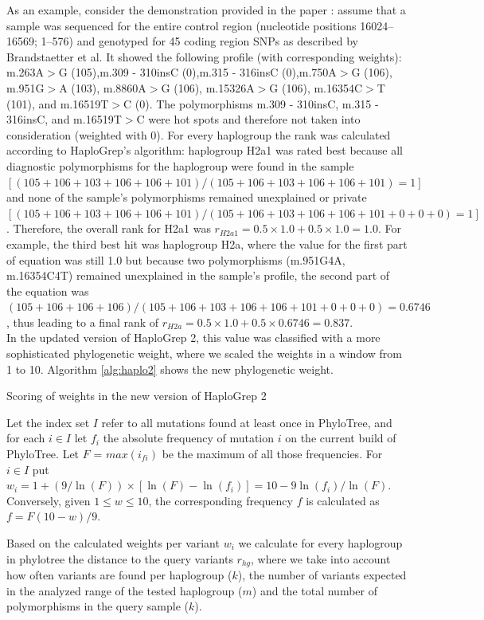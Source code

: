 As an example, consider the demonstration provided in the paper \cite{Kloss-Brandstatter2011}: assume that a sample was sequenced for the entire control region (nucleotide positions 16024–16569; 1–576) and genotyped for 45 coding region SNPs as described by Brandstaetter et al. It showed the following profile (with corresponding weights): m.263A$>$G (105),m.309 - 310insC (0),m.315 - 316insC (0),m.750A$>$G (106), m.951G$>$A (103), m.8860A$>$G (106), m.15326A$>$G (106), m.16354C$>$T (101), and m.16519T$>$C (0). The polymorphisms m.309 - 310insC, m.315 - 316insC, and m.16519T$>$C were hot spots and therefore not taken into consideration (weighted with 0). For every haplogroup the rank was calculated according to HaploGrep's algorithm: haplogroup H2a1 was rated best because all diagnostic polymorphisms for the haplogroup were found in the sample $[(105+106+103+106+106+101)/(105+106+103+106+106+101) = 1]$ and none of the sample’s polymorphisms remained unexplained or private $[(105+106+103+106+106+ 101)/(105+106+103+106+106+101+0+0+0)=1]$. Therefore, the overall rank for H2a1 was $r_{H2a1}=0.5\times 1.0 + 0.5 \times 1.0 = 1.0$. For example, the third best hit was haplogroup H2a, where the value for the first part of equation was still 1.0 but because two polymorphisms (m.951G4A, m.16354C4T) remained unexplained in the sample’s profile, the second part of the equation was $(105+106+106+106)/(105+106+103+106+106+101+0+0+0) = 0.6746$, thus leading to a final rank of $r_{H2a}= 0.5\times 1.0 + 0.5\times 0.6746 =0.837$.\\
In the updated version of HaploGrep 2, this value was classified with a more sophisticated phylogenetic weight, where we scaled the weights in a window from 1 to 10. Algorithm \ref{alg:haplo2} shows the new phylogenetic weight.
\begin{algorithm}
\caption{Scoring of weights in the new version of HaploGrep 2}
\label{alg:haplo2}
Let the index set $I$ refer to all mutations found at least once in PhyloTree, and for each $i \in I$ let $f_i$ the absolute frequency of mutation $i$ on the current build of PhyloTree. Let $F$ = $max(i_{fi})$ be the maximum of all those frequencies. For $i \in I$ put $w_i = 1+(9/\ln(F)) \times [\ln(F) - \ln(f_i)] = 10-9\ln(f_i) / \ln(F)$. Conversely, given $1 \leq w \leq 10$, the corresponding frequency $f$ is calculated as  $f = F(10 - w)/9$.
\end{algorithm}

Based on the calculated weights per variant $w_i$ we calculate for every haplogroup in phylotree the distance to the query variants $r_{hg}$, where we take into account how often variants are found per haplogroup ($k$), the number of variants expected in the analyzed range of the tested haplogroup ($m$) and the total number of polymorphisms in the query sample ($k$).

